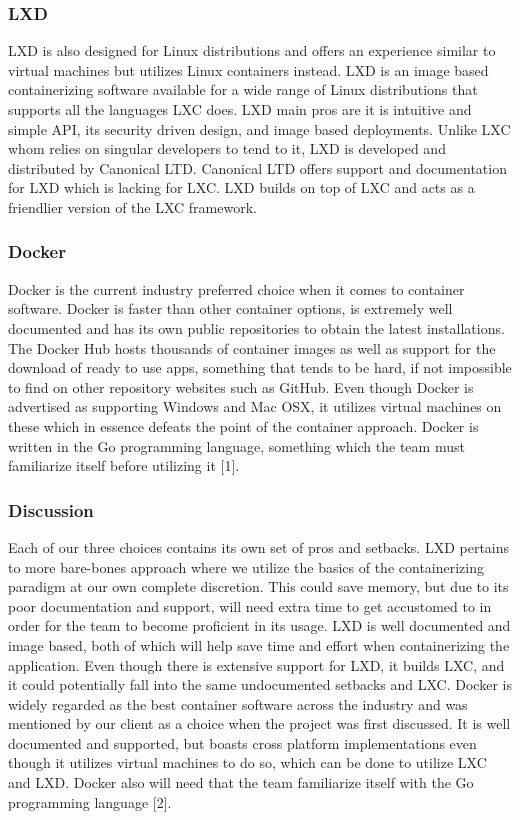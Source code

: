 \documentclass[article, onecolumn, draftclsnofoot,10pt, compsoc]{IEEEtran}
\begin{document}
\subsubsection{LXD}
LXD is also designed for Linux distributions and offers an experience similar to virtual machines but utilizes Linux containers instead. LXD is an image based containerizing software available for a wide range of Linux distributions that supports all the languages LXC does. LXD main pros are it is intuitive and simple API, its security driven design, and image based deployments. Unlike LXC whom relies on singular developers to tend to it, LXD is developed and distributed by Canonical LTD. Canonical LTD offers support and documentation for LXD which is lacking for LXC. LXD builds on top of LXC and acts as a friendlier version of the LXC framework. 

\subsubsection{Docker}
Docker is the current industry preferred choice when it comes to container software.  Docker is faster than other container options, is extremely well documented and has its own public repositories to obtain the latest installations. The Docker Hub hosts thousands of container images as well as support for the download of ready to use apps, something that tends to be hard, if not impossible to find on other repository websites such as GitHub. Even though Docker is advertised as supporting Windows and Mac OSX, it utilizes virtual machines on these which in essence defeats the point of the container approach. Docker is written in the Go programming language, something which the team must familiarize itself before utilizing it [1]. 

\subsubsection{Discussion}
Each of our three choices contains its own set of pros and setbacks. LXD pertains to more bare-bones approach where we utilize the basics of the containerizing paradigm at our own complete discretion. This could save memory, but due to its poor documentation and support, will need extra time to get accustomed to in order for the team to become proficient in its usage. LXD is well documented and image based, both of which will help save time and effort when containerizing the application. Even though there is extensive support for LXD, it builds LXC, and it could potentially fall into the same undocumented setbacks and LXC. Docker is widely regarded as the best container software across the industry and was mentioned by our client as a choice when the project was first discussed. It is well documented and supported, but boasts cross platform implementations even though it utilizes virtual machines to do so, which can be done to utilize LXC and LXD. Docker also will need that the team familiarize itself with the Go programming language [2]. 
\end{document}
